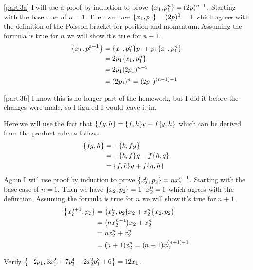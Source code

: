 \documentclass[boxes]{homework}
\makeatletter
\numberwithin{@problem}{section}
\makeatother
\begin{document}
\begin{solution}
	\ref{part:3a}
	I will use a proof by induction to prove $\pb{x_1}{p_1^n} = (2p)^{n-1}$. Starting with the base case of $n = 1$. Then we have $\pb{x_1}{p_1} = (2p)^0 = 1$ which agrees with the definition of the Poisson bracket for position and momentum. Assuming the formula is true for $n$ we will show it's true for $n+1$.
	\begin{align*}
		\pb{x_1}{p_1^{n+1}} & = \pb{x_1}{p_1^n}p_1 + p_1\pb{x_1}{p_1^n} \\
		                    & = 2p_1\pb{x_1}{p_1^n}                     \\
		                    & = 2p_1(2p_1)^{n-1}                        \\
		                    & = (2p_1)^n = (2p_1)^{(n + 1) - 1}
	\end{align*}


	\ref{part:3b}
	I know this is no longer part of the homework, but I did it before the changes were made, so I figured I would leave it in.

	Here we will use the fact that $\pb{fg}{h} = \pb{f}{h}g + f\pb{g}{h}$ which can be derived from the product rule as follows.
	\begin{align*}
		\pb{fg}{h} & = -\pb{h}{fg}              \\
		           & = -\pb{h}{f}g - f\pb{h}{g} \\
		           & = \pb{f}{h}g + f\pb{g}{h}
	\end{align*}
	Again I will use proof by induction to prove $\pb{x_2^n}{p_2} = nx_2^{n-1}$. Starting with the base case of $n = 1$. Then we have $\pb{x_2}{p_2} = 1\cdot x_2^0 = 1$ which agrees with the definition. Assuming the formula is true for $n$ we will show it's true for $n + 1$.
	\begin{align*}
		\pb{x_2^{n+1}}{p_2} & = \pb{x_2^n}{p_2}x_2 + x_2^n\pb{x_2}{p_2} \\
		                    & = \qty(nx_2^{n-1})x_2 + x_2^n             \\
		                    & = nx_2^n + x_2^n                          \\
		                    & = (n+1)x_2^n = (n+1)x_2^{(n+1)-1}
	\end{align*}
\end{solution}

\begin{problem}
Verify $\pb{-2p_1}{3x_1^2 + 7p_3^4 - 2x_2^2p_1^3 + 6} = 12x_1$.
\end{problem}
\end{document}
